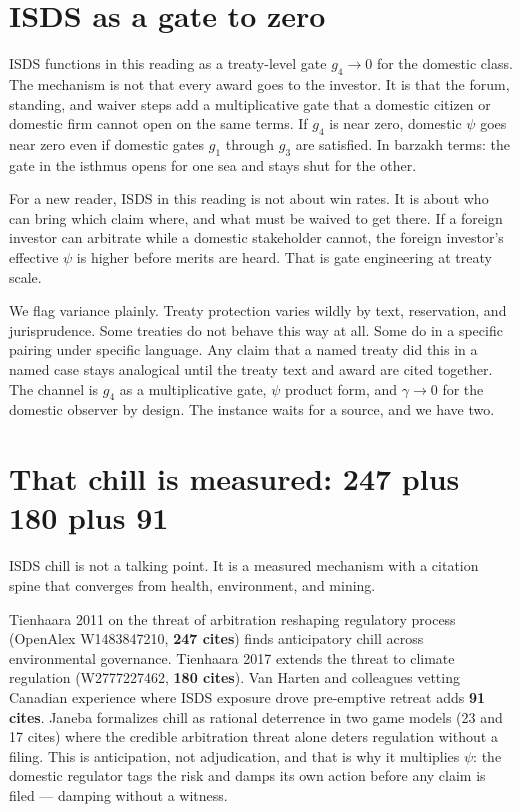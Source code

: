 \section{ISDS as a gate to zero}

ISDS functions in this reading as a treaty-level gate $g_4 \to 0$ for the domestic class. The mechanism is not that every award goes to the investor. It is that the forum, standing, and waiver steps add a multiplicative gate that a domestic citizen or domestic firm cannot open on the same terms. If $g_4$ is near zero, domestic $\psi$ goes near zero even if domestic gates $g_1$ through $g_3$ are satisfied. In barzakh terms: the gate in the isthmus opens for one sea and stays shut for the other.

For a new reader, ISDS in this reading is not about win rates. It is about who can bring which claim where, and what must be waived to get there. If a foreign investor can arbitrate while a domestic stakeholder cannot, the foreign investor's effective $\psi$ is higher before merits are heard. That is gate engineering at treaty scale.

We flag variance plainly. Treaty protection varies wildly by text, reservation, and jurisprudence. Some treaties do not behave this way at all. Some do in a specific pairing under specific language. Any claim that a named treaty did this in a named case stays analogical until the treaty text and award are cited together. The channel is $g_4$ as a multiplicative gate, $\psi$ product form, and $\gamma \to 0$ for the domestic observer by design. The instance waits for a source, and we have two.

\section{That chill is measured: 247 plus 180 plus 91}

ISDS chill is not a talking point. It is a measured mechanism with a citation spine that converges from health, environment, and mining.

Tienhaara 2011 on the threat of arbitration reshaping regulatory process (OpenAlex W1483847210, \textbf{247 cites}) finds anticipatory chill across environmental governance. Tienhaara 2017 extends the threat to climate regulation (W2777227462, \textbf{180 cites}). Van Harten and colleagues vetting Canadian experience where ISDS exposure drove pre-emptive retreat adds \textbf{91 cites}. Janeba formalizes chill as rational deterrence in two game models (23 and 17 cites) where the credible arbitration threat alone deters regulation without a filing. This is anticipation, not adjudication, and that is why it multiplies $\psi$: the domestic regulator tags the risk and damps its own action before any claim is filed --- damping without a witness.

